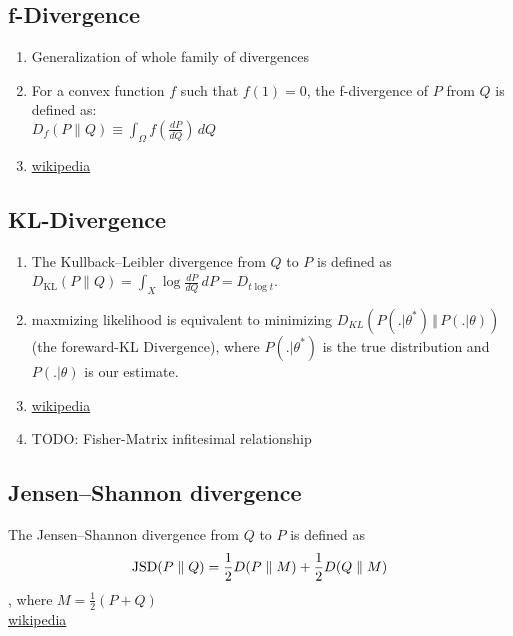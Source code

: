 \subsection{f-Divergence}
\begin{enumerate}
	\item Generalization of whole family of divergences
	\item For a convex function $f$ such that $f(1) = 0$, the f-divergence of $P$ from $Q$ is defined as:\\
	$D_{f}(P\parallel Q)\equiv \int _{{\Omega }}f\left({\frac{dP}{dQ}}\right)\,dQ$
	\item \href{https://en.wikipedia.org/wiki/Divergence_(statistics)}{wikipedia}
\end{enumerate}

\subsection{KL-Divergence}
\begin{enumerate}
	\item The Kullback–Leibler divergence from $Q$ to $P$ is defined as\\
	$D_{\mathrm {KL} }(P\|Q)=\int _{X}\log {\frac {dP}{dQ}}\,dP=D_{t\log t}$.
	\item maxmizing likelihood is equivalent to minimizing $D_{KL}(P(. \vert \theta^{\ast}) \, \Vert \, P(. \vert \theta))$ (the foreward-KL Divergence), where $P(. \vert \theta^{\ast})$ is the true distribution and $P(. \vert \theta)$ is our estimate.
	\item \href{https://en.wikipedia.org/wiki/Kullback–Leibler_divergence}{wikipedia}
	\item TODO: Fisher-Matrix infitesimal relationship
\end{enumerate}

\subsection{Jensen–Shannon divergence}
The Jensen–Shannon divergence from $Q$ to $P$ is defined as
\begin{align*}
	{{\rm {JSD}}}(P\parallel Q)={\frac  {1}{2}}D(P\parallel M)+{\frac  {1}{2}}D(Q\parallel M)
\end{align*}, where $M={\frac  {1}{2}}(P+Q)$\\
\href{https://en.wikipedia.org/wiki/Jensen–Shannon_divergence}{wikipedia}

